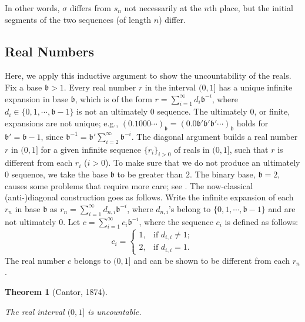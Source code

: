 \documentclass[12pt]{article}
\newtheorem{theorem}{Theorem}[]
\begin{document}
In other words, $\sigma$ differs from $s_n$ not necessarily at the $n$th place, but the initial segments of the two sequences (of length $n$) differ.



\subsection{Real Numbers}
Here, we apply this inductive argument to show the uncountability of the reals.
Fix a base $\mathfrak{b}>1$.  Every real number $r$ in the interval $(0,1]$ has a unique infinite expansion in base $\mathfrak{b}$, which is of the form $r=\sum_{i=1}^{\infty}d_i\mathfrak{b}^{-i}$, where   $d_i\in\{0,1,\cdots,\mathfrak{b}-1\}$ is not an ultimately $0$ sequence. The ultimately $0$, or finite, expansions are not unique; e.g.,   $(0.1000\cdots)_{\mathfrak{b}}
=(0.0\mathfrak{b}'\mathfrak{b}'\mathfrak{b}'\cdots)_{\mathfrak{b}}$
 holds for $\mathfrak{b}'=\mathfrak{b}-1$, since $\mathfrak{b}^{-1}=\mathfrak{b}'\sum_{i=2}^{\infty}\mathfrak{b}^{-i}$.
The diagonal argument builds a real number $r$ in $(0,1]$ for a given infinite sequence $\{r_i\}_{i>0}$ of reals in $(0,1]$, such that $r$ is different from each $r_i$ ($i>0$). To make sure that we do not produce an ultimately $0$ sequence, we take the base $\mathfrak{b}$ to be greater than $2$.
The binary base, $\mathfrak{b}=2$, causes some problems that require more care; see \textbf{\cite[{\rm p.~54}]{F76}}.
The now-classical (anti-)diagonal construction goes as follows.
Write the infinite expansion of each $r_n$ in base $\mathfrak{b}$ as $r_n=\sum_{i=1}^{\infty}d_{n,i}\mathfrak{b}^{-i}$, where $d_{n,i}$'s belong to $\{0,1,\cdots,\mathfrak{b}-1\}$ and are not ultimately $0$. Let $c=\sum_{i=1}^{\infty}c_i\mathfrak{b}^{-i}$, where the sequence $c_i$ is defined as follows: $$c_i=\begin{cases}
                1, & \mbox{if } d_{i,i}\neq 1; \\
                2, & \mbox{if } d_{i,i} = 1.
              \end{cases}$$
 The real number $c$ belongs to $(0,1]$ and can be shown to be different from each $r_n$.

\begin{theorem}[Cantor, 1874]
\,

\noindent
The real interval $(0,1]$ is uncountable.
\end{theorem}
\end{document}
